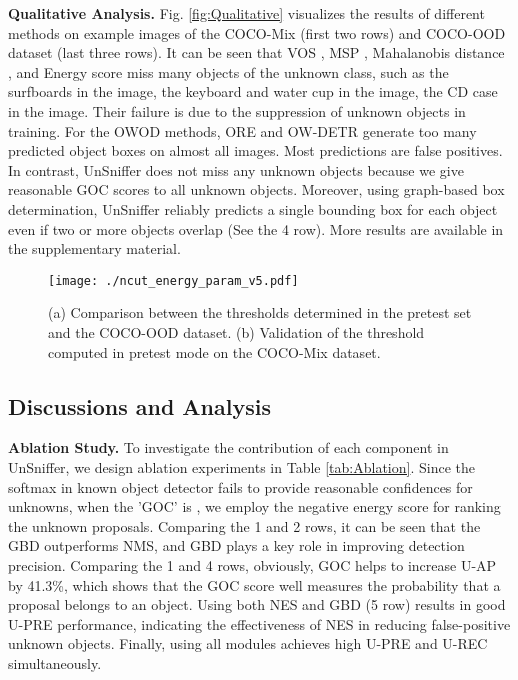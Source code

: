 \documentclass[10pt,twocolumn,letterpaper]{article}
\newcommand{\net}{UnSniffer\xspace}
\begin{document}
\noindent\textbf{Qualitative Analysis.}
\label{sec:Qualitative}
Fig. \ref{fig:Qualitative} visualizes the results of different methods on example images of the COCO-Mix (first two rows) and COCO-OOD dataset (last three rows).
It can be seen that VOS \cite{vos}, MSP \cite{hendrycks2016baseline}, Mahalanobis distance \cite{denouden2018improving}, and Energy score \cite{liu2020energy} miss many objects of the unknown class,
such as the surfboards in the  image,
the keyboard and water cup in the  image,
the CD case in the  image.
Their failure is due to the suppression of unknown objects in training.
For the OWOD methods,
ORE and OW-DETR generate too many predicted object boxes on almost all images.
Most predictions are false positives.
In contrast,
UnSniffer does not miss any unknown objects because we give reasonable GOC scores to all unknown objects.
Moreover, using graph-based box determination,
UnSniffer reliably predicts a single bounding box for each object even if two or more objects overlap (See the 4 row).
More results are available in the supplementary material.



\begin{figure}
\centering
\texttt{[image: ./ncut\_energy\_param\_v5.pdf]}
\vspace{-2em}
\caption{
(a) Comparison between the thresholds  determined in the pretest set and the COCO-OOD dataset. 
(b) Validation of the threshold  computed in pretest mode on the COCO-Mix dataset.
}
\vspace{-14pt}
\label{fig:pretest}
\end{figure}

\subsection{Discussions and Analysis}
\label{sec:Analysis}
\noindent\textbf{Ablation Study.}
To investigate the contribution of each component in \net,
we design ablation experiments in Table \ref{tab:Ablation}.
Since the softmax in known object detector fails to provide reasonable confidences for unknowns,
when the 'GOC' is ,
we employ the negative energy score for ranking the unknown proposals.
Comparing the 1 and 2 rows,
it can be seen that the GBD outperforms NMS,
and GBD plays a key role in improving detection precision.
Comparing the 1 and 4 rows,
obviously,
GOC helps to increase U-AP by 41.3\%,
which shows that the GOC score well measures the probability that a proposal belongs to an object.
Using both NES and GBD (5 row) results in good U-PRE performance,
indicating the effectiveness of NES in reducing false-positive unknown objects.
Finally, using all modules achieves high U-PRE and U-REC simultaneously.
\end{document}
